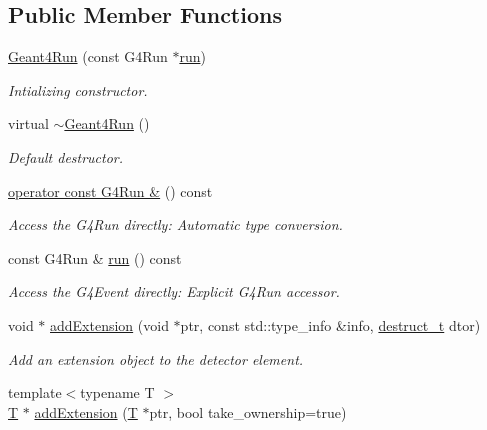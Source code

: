 \subsection*{Public Member Functions}
\begin{DoxyCompactItemize}
\item 
\hyperlink{class_d_d4hep_1_1_simulation_1_1_geant4_run_a93e0b66a97b9b04f65c1d59882d248f3}{Geant4\+Run} (const G4\+Run $\ast$\hyperlink{class_d_d4hep_1_1_simulation_1_1_geant4_run_a43d61bb9443562c4402d062df6750191}{run})
\begin{DoxyCompactList}\small\item\em Intializing constructor. \end{DoxyCompactList}\item 
virtual \hyperlink{class_d_d4hep_1_1_simulation_1_1_geant4_run_a9a508d7ab8cb68013b9e3cd370c2374a}{$\sim$\+Geant4\+Run} ()
\begin{DoxyCompactList}\small\item\em Default destructor. \end{DoxyCompactList}\item 
\hyperlink{class_d_d4hep_1_1_simulation_1_1_geant4_run_a2a3e5d37a3e604de125673b5a5c07ea6}{operator const G4\+Run \&} () const
\begin{DoxyCompactList}\small\item\em Access the G4\+Run directly\+: Automatic type conversion. \end{DoxyCompactList}\item 
const G4\+Run \& \hyperlink{class_d_d4hep_1_1_simulation_1_1_geant4_run_a43d61bb9443562c4402d062df6750191}{run} () const
\begin{DoxyCompactList}\small\item\em Access the G4\+Event directly\+: Explicit G4\+Run accessor. \end{DoxyCompactList}\item 
void $\ast$ \hyperlink{class_d_d4hep_1_1_simulation_1_1_geant4_run_aa825451bec9637a51d98d46e23334b75}{add\+Extension} (void $\ast$ptr, const std\+::type\+\_\+info \&info, \hyperlink{class_d_d4hep_1_1_object_extensions_a705a3524f9097577069a83993a39a9b2}{destruct\+\_\+t} dtor)
\begin{DoxyCompactList}\small\item\em Add an extension object to the detector element. \end{DoxyCompactList}\item 
{\footnotesize template$<$typename T $>$ }\\\hyperlink{class_t}{T} $\ast$ \hyperlink{class_d_d4hep_1_1_simulation_1_1_geant4_run_a6728686af7406ddfd13f20e7f32f567c}{add\+Extension} (\hyperlink{class_t}{T} $\ast$ptr, bool take\+\_\+ownership=true)

\end{DoxyCompactItemize}
